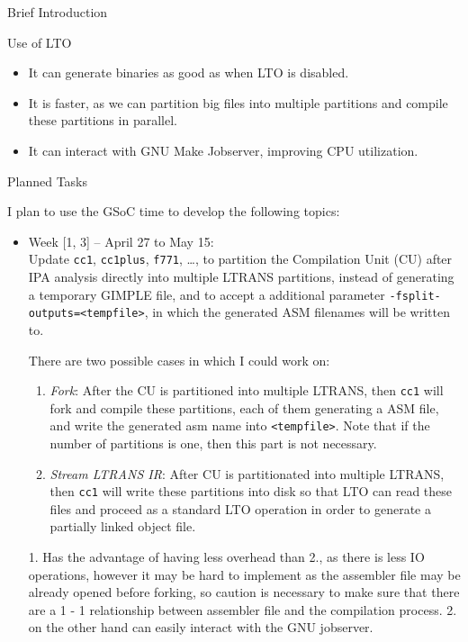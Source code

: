 \documentclass[12pt]{article}
\begin{document}
\begin{section}{Brief Introduction}
\begin{section}{Use of LTO}
\begin{itemize}
    \item It can generate binaries as good as when LTO is disabled.
    \item It is faster, as we can partition big files into multiple partitions
    and compile these partitions in parallel.
    \item It can interact with GNU Make Jobserver, improving CPU utilization.

\end{itemize}

\end{section}

\begin{section}{Planned Tasks}

I plan to use the GSoC time to develop the following topics:

\begin{itemize}
 \item{Week [1, 3] -- April 27 to May 15:} \\
  Update \texttt{cc1}, \texttt{cc1plus}, \texttt{f771}, \ldots, to partition
  the Compilation Unit (CU) after IPA analysis directly into multiple LTRANS
  partitions, instead of generating a temporary GIMPLE file, and to accept a
  additional parameter \texttt{-fsplit-outputs=<tempfile>}, in which the
  generated ASM filenames will be written to.

  There are two possible cases in which I could work on:
  \begin{enumerate}
    \item \textit{Fork}: After the CU is partitioned into multiple LTRANS, then
    \texttt{cc1} will fork and compile these partitions, each of them
    generating a ASM file, and write the generated asm name into
    \texttt{<tempfile>}.  Note that if the number of partitions is one, then
    this part is not necessary.

    \item \textit{Stream LTRANS IR}: After CU is partitionated into multiple
    LTRANS, then \texttt{cc1} will write these partitions into disk so that LTO
    can read these files and proceed as a standard LTO operation in order to
    generate a partially linked object file.
  \end{enumerate}

  1. Has the advantage of having less overhead than 2., as there is less IO operations,
  however it may be hard to implement as the assembler file may be already
  opened before forking, so caution is necessary to make sure that there are a
  1 - 1 relationship between assembler file and the compilation process. 2.
  on the other hand can easily interact with the GNU jobserver.


\end{itemize}
\end{section}
\end{section}
\end{document}
